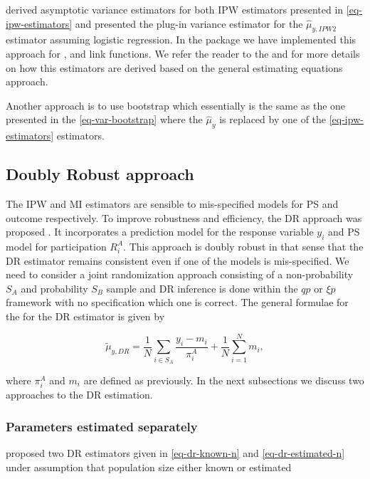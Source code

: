 \documentclass[
]{jss}
\begin{document}
\citet[section 3.2]{chen2020doubly} derived asymptotic variance
estimators for both IPW estimators presented in
\eqref{eq-ipw-estimators} and presented the plug-in variance estimator
for the \(\hat{\mu}_{y,IPW2}\) estimator assuming logistic regression.
In the package we have implemented this approach for ,
 and  link functions. We refer the reader to
the \citet[section 6.2]{wu2022statistical} and
\citet[chapter 3]{chrostowski2024statistical} for more details on how
this estimators are derived based on the general estimating equations
approach.

Another approach is to use bootstrap which essentially is the same as
the one presented in the \eqref{eq-var-bootstrap} where the
\(\hat{\mu}_y\) is replaced by one of the \eqref{eq-ipw-estimators}
estimators.

\subsection{Doubly Robust approach}\label{sec-dr-approach}

The IPW and MI estimators are sensible to mis-specified models for PS
and outcome respectively. To improve robustness and efficiency, the DR
approach was proposed \citep[cf.][]{robins1994estimation}. It
incorporates a prediction model for the response variable \(y_i\) and PS
model for participation \(R_i^A\). This approach is doubly robust in
that sense that the DR estimator remains consistent even if one of the
models is mis-specified. We need to consider a joint randomization
approach consisting of a non-probability \(S_A\) and probability \(S_B\)
sample and DR inference is done within the \(qp\) or \(\xi p\) framework
with no specification which one is correct. The general formulae for the
for the DR estimator is given by

\[
\tilde{\mu}_{y,DR} = \frac{1}{N}\sum_{i \in S_A}\frac{y_i - m_i}{\pi_i^A} + \frac{1}{N}\sum_{i =1}^N m_i,
\]

where \(\pi_i^A\) and \(m_i\) are defined as previously. In the next
subsections we discuss two approaches to the DR estimation.

\subsubsection{Parameters estimated
separately}\label{parameters-estimated-separately}

\citet{chen2020doubly} proposed two DR estimators given in
\eqref{eq-dr-known-n} and \eqref{eq-dr-estimated-n} under assumption
that population size either known or estimated
\end{document}
